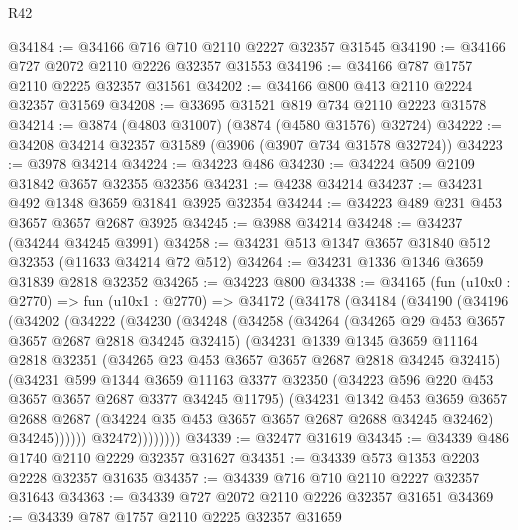 \begin{lexlean}{R42}
\begin{coremodule}
@34184 := @34166 @716 @710 @2110 @2227 @32357 @31545
@34190 := @34166 @727 @2072 @2110 @2226 @32357 @31553
@34196 := @34166 @787 @1757 @2110 @2225 @32357 @31561
@34202 := @34166 @800 @413 @2110 @2224 @32357 @31569
@34208 := @33695 @31521 @819 @734 @2110 @2223 @31578
@34214 := @3874 (@4803 @31007) (@3874 (@4580 @31576) @32724)
@34222 := @34208 @34214 @32357 @31589 (@3906 (@3907 @734 @31578 @32724))
@34223 := @3978 @34214
@34224 := @34223 @486
@34230 := @34224 @509 @2109 @31842 @3657 @32355 @32356
@34231 := @4238 @34214
@34237 := @34231 @492 @1348 @3659 @31841 @3925 @32354
@34244 := @34223 @489 @231 @453 @3657 @3657 @2687 @3925
@34245 := @3988 @34214
@34248 := @34237 (@34244 @34245 @3991)
@34258 := @34231 @513 @1347 @3657 @31840 @512 @32353 (@11633 @34214 @72 @512)
@34264 := @34231 @1336 @1346 @3659 @31839 @2818 @32352
@34265 := @34223 @800
@34338 := @34165
    (fun (u10x0 : @2770) =>
    fun (u10x1 : @2770) =>
    @34172
      (@34178
        (@34184
          (@34190
            (@34196
              (@34202
                (@34222
                  (@34230
                    (@34248
                      (@34258
                        (@34264
                          (@34265 @29 @453 @3657 @3657 @2687 @2818 @34245 @32415)
                          (@34231
                            @1339
                            @1345
                            @3659
                            @11164
                            @2818
                            @32351
                            (@34265 @23 @453 @3657 @3657 @2687 @2818 @34245 @32415)
                            (@34231
                              @599
                              @1344
                              @3659
                              @11163
                              @3377
                              @32350
                              (@34223 @596 @220 @453 @3657 @3657 @2687 @3377 @34245 @11795)
                              (@34231
                                @1342
                                @453
                                @3659
                                @3657
                                @2688
                                @2687
                                (@34224 @35 @453 @3657 @3657 @2687 @2688 @34245 @32462)
                                @34245))))))
                    @32472))))))))
@34339 := @32477 @31619
@34345 := @34339 @486 @1740 @2110 @2229 @32357 @31627
@34351 := @34339 @573 @1353 @2203 @2228 @32357 @31635
@34357 := @34339 @716 @710 @2110 @2227 @32357 @31643
@34363 := @34339 @727 @2072 @2110 @2226 @32357 @31651
@34369 := @34339 @787 @1757 @2110 @2225 @32357 @31659

\end{coremodule}
\end{lexlean}
